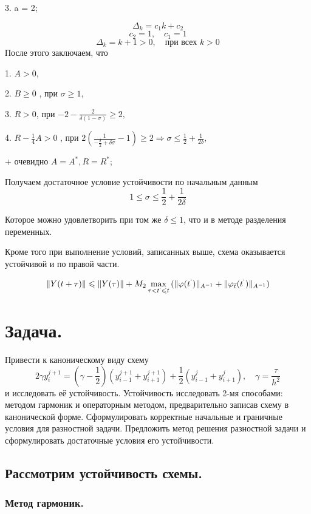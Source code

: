 \documentclass[12pt,a4paper]{article}
\renewcommand{\leq}{\leqslant}
\renewcommand{\geq}{\geqslant}
\begin{document}
\begin{flushleft}
3. a = 2;
\end{flushleft}
$$\Delta_k = c_1 k + c_2$$
$$c_2 = 1,\quad c_1 = 1 $$
$$\Delta_k = k + 1 > 0, \quad \text{при всех } k > 0$$
После этого заключаем, что
\begin{flushleft}
1. $A > 0,$

2. $B\geq 0$ , при $ \sigma\geq1,$

3. $R > 0$, при  $-2 - \frac{2}{\delta(1-\sigma)}\geq 2,$

4. $R - \frac{1}{4}A > 0$ , при $2(\frac{1}{-\frac{\delta}{2} + \delta\sigma}-1)\geq2\Rightarrow \sigma\leq \frac{1}{2} + \frac{1}{2\delta},$

+ очевидно $A=A^{*}, R=R^{*}$;
\end{flushleft}
 
Получаем достаточное условие  устойчивости по начальным данным    $$ 1\leq\sigma\leq\frac{1}{2}+\frac{1}{2\delta}$$

Которое можно удовлетворить при том же $\delta\leq1$, что и в методе разделения переменных. 

Кроме того при выполнение условий, записанных выше, схема оказывается устойчивой и по правой части. 

$$\|Y(t+\tau)\|\leq \|Y(\tau)\| + M_2\max_{\tau < t^{`} \leq t}{(\| \varphi(t^{`})\|_{A^{-1}} + \| \varphi_{\bar{t}}(t^{`})\|_{A^{-1}})}$$

\section{Задача.} 
Привести к каноническому виду схему 
$$ 2\gamma y_i^{j+1} = (\gamma-\frac{1}{2})(y_{i-1}^{j+1} + y_{i+1}^{j+1}) +\frac{1}{2}(y_{i-1}^j+ y_{i+1}^j), \quad \gamma = \frac{\tau}{h^2}$$
и исследовать её устойчивость. Устойчивость исследовать 2-мя способами: методом гармоник и операторным методом, предварительно записав схему в канонической форме. Сформулировать корректные начальные и граничные условия для разностной задачи. Предложить метод решения разностной задачи и сформулировать достаточные условия его устойчивости.

\subsection{Рассмотрим устойчивость схемы.}

\subsubsection{Метод гармоник.}
\end{document}
